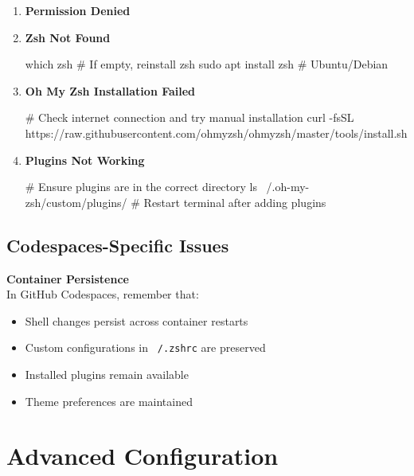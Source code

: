 \documentclass{article}
\begin{document}
\begin{enumerate}
    \item \textbf{Permission Denied}
    
    \item \textbf{Zsh Not Found}
    \begin{codebox}
which zsh
\# If empty, reinstall zsh
sudo apt install zsh  \# Ubuntu/Debian
    \end{codebox}
    
    \item \textbf{Oh My Zsh Installation Failed}
    \begin{codebox}
\# Check internet connection and try manual installation
curl -fsSL https://raw.githubusercontent.com/ohmyzsh/ohmyzsh/master/tools/install.sh
    \end{codebox}
    
    \item \textbf{Plugins Not Working}
    \begin{codebox}
\# Ensure plugins are in the correct directory
ls ~/.oh-my-zsh/custom/plugins/
\# Restart terminal after adding plugins
    \end{codebox}
\end{enumerate}

\subsection{Codespaces-Specific Issues}

\begin{warningbox}
\textbf{Container Persistence}\\
In GitHub Codespaces, remember that:
\begin{itemize}
    \item Shell changes persist across container restarts
    \item Custom configurations in \texttt{~/.zshrc} are preserved
    \item Installed plugins remain available
    \item Theme preferences are maintained
\end{itemize}
\end{warningbox}

\section{Advanced Configuration}
\end{document}
